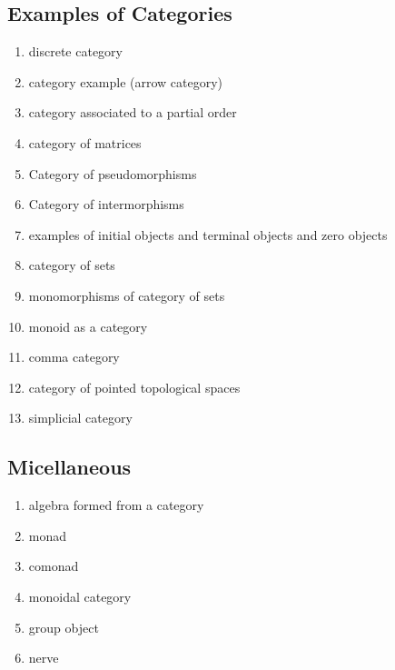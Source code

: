 \documentclass[12pt]{article}
\begin{document}
\begin{multicols}{2}
\subsection{Examples of Categories}
\begin{enumerate}
\item discrete category
\item category example (arrow category)
\item category associated to a partial order
\item category of matrices
\item Category of pseudomorphisms
\item Category of intermorphisms
\item examples of initial objects and terminal objects and zero objects
\item category of sets
\item monomorphisms of category of sets
\item monoid as a category
\item comma category
\item category of pointed topological spaces
\item simplicial category
\end{enumerate}

\subsection{Micellaneous}
\begin{enumerate}
\item algebra formed from a category
\item monad
\item comonad 
\item monoidal category
\item group object
\item nerve

\end{enumerate}


\end{multicols}
\end{document}
